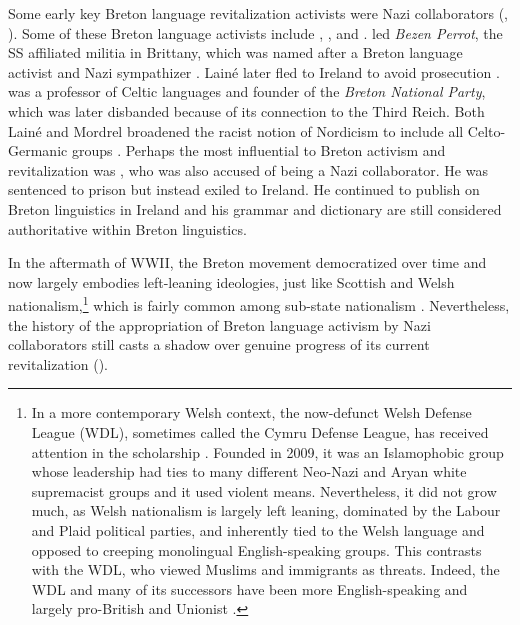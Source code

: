 \documentclass[output=paper,colorlinks,citecolor=brown]{langscibook}
\begin{document}
Some early key Breton language revitalization activists were Nazi collaborators (\citealt{jp:Leach2010}, \citealt{jp:Boomgaard2008}). Some of these Breton language activists include , , and .  led \textit{Bezen Perrot}, the SS affiliated militia in Brittany, which was named after a Breton language activist and Nazi sympathizer  \citep{jp:Leach2008}. Lainé later fled to Ireland to avoid prosecution \citep{jp:Leach2010}.  was a professor of Celtic languages and founder of the \emph{Breton National Party}, which was later disbanded because of its connection to the Third Reich. Both Lainé and Mordrel broadened the racist notion of Nordicism to include all Celto-Germanic groups \citep{jp:Leach2010}. Perhaps the most influential to Breton activism and revitalization was , who was also accused of being a Nazi collaborator. He was sentenced to prison but instead exiled to Ireland. He continued to publish on Breton linguistics in Ireland and his grammar and dictionary are still considered authoritative within Breton linguistics.

In the aftermath of WWII, the  Breton movement democratized over time and now largely embodies left-leaning ideologies, just like Scottish and Welsh nationalism,\footnote{In a more contemporary Welsh context, the now-defunct Welsh Defense League (WDL), sometimes called the Cymru Defense League, has received attention in the scholarship \citep{jp:Alessio2015}. Founded in 2009, it was an Islamophobic group whose leadership had ties to many different Neo-Nazi and Aryan white supremacist groups and it used violent means. Nevertheless, it did not grow much, as Welsh nationalism is largely left leaning, dominated by the Labour and Plaid political parties, and inherently tied to the Welsh language and opposed to creeping monolingual English-speaking groups. This contrasts with the WDL, who viewed Muslims and immigrants as threats. Indeed, the WDL and many of its successors have been more English-speaking and largely pro-British and Unionist \citep{jp:Alessio2015}.} which is fairly common among sub-state nationalism \citep{jp:Alessio2015}. Nevertheless, the history of the appropriation of Breton language activism by Nazi collaborators still casts a shadow over genuine progress of its current revitalization (\citealt{jp:HornsbyQuentel2013, jp:HornsbyToutous2021}).
\end{document}
